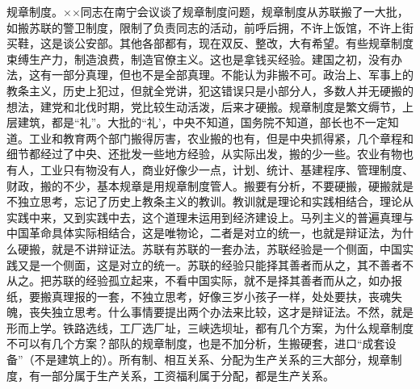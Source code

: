 规章制度。××同志在南宁会议谈了规章制度问题，规章制度从苏联搬了一大批，如搬苏联的警卫制度，限制了负责同志的活动，前呼后拥，不许上饭馆，不许上街买鞋，这是谈公安部。其他各部都有，现在双反、整改，大有希望。有些规章制度束缚生产力，制造浪费，制造官僚主义。这也是拿钱买经验。建国之初，没有办法，这有一部分真理，但也不是全部真理。不能认为非搬不可。政治上、军事上的教条主义，历史上犯过，但就全党讲，犯这错误只是小部分人，多数人并无硬搬的想法，建党和北伐时期，党比较生动活泼，后来才硬搬。规章制度是繁文缛节，上层建筑，都是“礼”。大批的“礼’，中央不知道，国务院不知道，部长也不一定知道。工业和教育两个部门搬得厉害，农业搬的也有，但是中央抓得紧，几个章程和细节都经过了中央、还批发一些地方经验，从实际出发，搬的少一些。农业有物也有人，工业只有物没有人，商业好像少一点，计划、统计、基建程序、管理制度、财政，搬的不少，基本规章是用规章制度管人。搬要有分析，不要硬搬，硬搬就是不独立思考，忘记了历史上教条主义的教训。教训就是理论和实践相结合，理论从实践中来，又到实践中去，这个道理未运用到经济建设上。马列主义的普遍真理与中国革命具体实际相结合，这是唯物论，二者是对立的统一，也就是辩证法，为什么硬搬，就是不讲辩证法。苏联有苏联的一套办法，苏联经验是一个侧面，中国实践又是一个侧面，这是对立的统一。苏联的经验只能择其善者而从之，其不善者不从之。把苏联的经验孤立起来，不看中国实际，就不是择其善者而从之，如办报纸，要搬真理报的一套，不独立思考，好像三岁小孩子一样，处处要扶，丧魂失魄，丧失独立思考。什么事情要提出两个办法来比较，这才是辩证法。不然，就是形而上学。铁路选线，工厂选厂址，三峡选坝址，都有几个方案，为什么规章制度不可以有几个方案？部队的规章制度，也是不加分析，生搬硬套，进口“成套设备”（不是建筑上的）。所有制、相互关系、分配为生产关系的三大部分，规章制度，有一部分属于生产关系，工资福利属于分配，都是生产关系。


